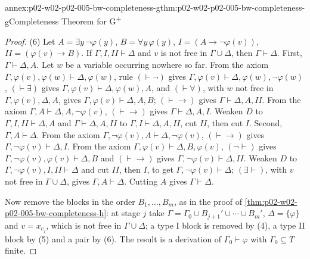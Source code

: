 \begin{annexitem}{annex:p02-w02-p02-005-bw-completeness-g}{thm:p02-w02-p02-005-bw-completeness-g}{Completeness Theorem for G\textsuperscript{+}}
\begin{proof}
(6) Let \(A=\exists y\,\neg\varphi(y)\), \(B=\forall y\,\varphi(y)\),
\(I=(A\to\neg\varphi(v))\), \(I\!I=(\varphi(v)\to B)\).  If
\(\Gamma,I,I\!I\vdash\Delta\) and \(v\) is not free in \(\Gamma\cup\Delta\),
then \(\Gamma\vdash\Delta\).  First, \(\Gamma\vdash\Delta,A\).  Let \(w\) be
a variable occurring nowhere so far.  From the axiom
\(\Gamma,\varphi(v),\varphi(w)\vdash\Delta,\varphi(w)\), rule
\((\vdash\neg)\) gives \(\Gamma,\varphi(v)\vdash\Delta,\varphi(w),\neg\varphi(w)\),
\((\vdash\exists)\) gives \(\Gamma,\varphi(v)\vdash\Delta,\varphi(w),A\), and
\((\vdash\forall)\), with \(w\) not free in \(\Gamma,\varphi(v),\Delta,A\),
gives \(\Gamma,\varphi(v)\vdash\Delta,A,B\); \((\vdash\to)\) gives
\(\Gamma\vdash\Delta,A,I\!I\).  From the axiom
\(\Gamma,A\vdash\Delta,A,\neg\varphi(v)\), \((\vdash\to)\) gives
\(\Gamma\vdash\Delta,A,I\).  Weaken \(D\) to \(\Gamma,I,I\!I\vdash\Delta,A\)
and \(\Gamma\vdash\Delta,A,I\!I\) to \(\Gamma,I\vdash\Delta,A,I\!I\), cut
\(I\!I\), then cut \(I\).  Second, \(\Gamma,A\vdash\Delta\).  From the axiom
\(\Gamma,\neg\varphi(v),A\vdash\Delta,\neg\varphi(v)\), \((\vdash\to)\)
gives \(\Gamma,\neg\varphi(v)\vdash\Delta,I\).  From the axiom
\(\Gamma,\varphi(v)\vdash\Delta,B,\varphi(v)\), \((\neg\vdash)\) gives
\(\Gamma,\neg\varphi(v),\varphi(v)\vdash\Delta,B\) and \((\vdash\to)\)
gives \(\Gamma,\neg\varphi(v)\vdash\Delta,I\!I\).  Weaken \(D\) to
\(\Gamma,\neg\varphi(v),I,I\!I\vdash\Delta\) and cut \(I\!I\), then \(I\),
to get \(\Gamma,\neg\varphi(v)\vdash\Delta\); \((\exists\vdash)\), with
\(v\) not free in \(\Gamma\cup\Delta\), gives \(\Gamma,A\vdash\Delta\).
Cutting \(A\) gives \(\Gamma\vdash\Delta\).

Now remove the blocks in the order \(B_1,\ldots,B_m\), as in the proof of
\cref{thm:p02-w02-p02-005-bw-completeness-h}: at stage \(j\) take
\(\Gamma=\Gamma_0\cup B_{j+1}'\cup\cdots\cup B_m'\), \(\Delta=\{\varphi\}\)
and \(v=x_{c_j}\), which is not free in \(\Gamma\cup\Delta\); a type I
block is removed by (4), a type II block by (5) and a pair by (6).  The
result is a derivation of \(\Gamma_0\vdash\varphi\) with
\(\Gamma_0\subseteq T\) finite.
\end{proof}
\end{annexitem}

